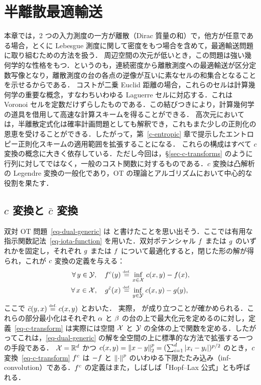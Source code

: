 
\chapter{半離散最適輸送}
\label{c-algo-semidiscr}

本章では，2 つの入力測度の一方が離散（Dirac 質量の和）で，他方が任意である場合，とくに Lebesgue 測度に関して密度をもつ場合を含めて，最適輸送問題に取り組むための方法を扱う．
%
周辺空間の次元が低いとき，この問題は強い幾何学的な性格をもつ．というのも，連続密度から離散測度への最適輸送が区分定数写像となり，離散測度の台の各点の逆像が互いに素なセルの和集合となることを示せるからである．
%
コストが二乗 Euclid 距離の場合，これらのセルは計算幾何学の重要な概念，すなわちいわゆる Laguerre セルに対応する．これは Voronoi セルを定数だけずらしたものである．この結びつきにより，計算幾何学の道具を借用して高速な計算スキームを得ることができる．
%
高次元においては，半離散定式化は確率計画問題としても解釈でき，これもまた少しの正則化の恩恵を受けることができる．したがって，第~\ref{c-entropic} 章で提示したエントロピー正則化スキームの適用範囲を拡張することになる．
%
これらの構成はすべて $c$ 変換の概念に大きく依存している．ただし今回は，\S\ref{sec-c-transforms} のように行列に対してではなく，一般のコスト関数に対するものである．$c$ 変換は凸解析の Legendre 変換の一般化であり，OT の理論とアルゴリズムにおいて中心的な役割を果たす．

\section{$c$ 変換と $\bar c$ 変換}
\label{s-c-transform}

双対 OT 問題~\eqref{eq-dual-generic} は
と書けたことを思い出そう．ここでは有用な指示関数記法~\eqref{eq-iota-function} を用いた．双対ポテンシャル $f$ または $g$ のいずれかを固定し，それぞれ $g$ または $f$ について最適化すると，閉じた形の解が得られ，これが $c$ 変換の定義を与える：
\begin{align}\label{eq-c-transform}
	\forall \, y \in \mathcal{Y}, \quad
	f^c(y) &\stackrel{\mbox{\upshape\tiny def.}}{=} \underset{x \in \mathcal{X}}{\inf}\; c(x,y) - f(x), \\
	\forall \, x \in \mathcal{X}, \quad
	g^{\bar{c}}(x) &\stackrel{\mbox{\upshape\tiny def.}}{=} \underset{y \in \mathcal{Y}}{\inf}\; c(x,y) - g(y),
\end{align}
ここで $\bar{c}(y,x) \stackrel{\mbox{\upshape\tiny def.}}{=} c(x,y)$ とおいた．
%
実際，
が成り立つことが確かめられる．これらの部分最小化はそれぞれ $\alpha$ と $\beta$ の台の上で最大化元を定めるのに対し，定義~\eqref{eq-c-transform} は実際には空間 $\mathcal{X}$ と $\mathcal{Y}$ の全体の上で関数を定める．したがってこれは，\eqref{eq-dual-generic} の解を全空間の上に標準的な方法で拡張する一つの手段である．
%
$\mathcal{X}=\mathbb{R}^d$ かつ $c(x,y)=\left\| x-y \right\|_2^p=(\sum_{i=1}^d \left\lvert x_i-y_i\right\rvert)^{p/2}$ のとき，$c$ 変換~\eqref{eq-c-transform} $f^c$ は $-f$ と $\left\| \cdot \right\|^p$ のいわゆる下限たたみ込み（inf-convolution）である．$f^c$ の定義はまた，しばしば「Hopf--Lax 公式」とも呼ばれる．

